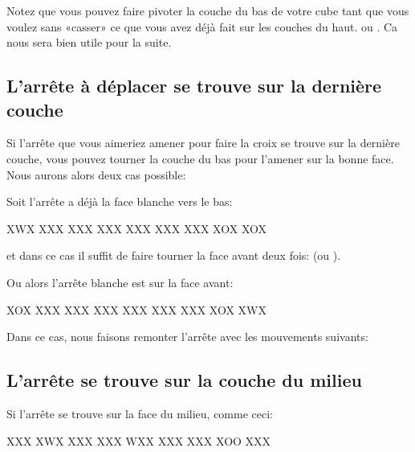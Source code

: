 \documentclass[10pt,paper=a5,pagesize]{scrbook}
\begin{document}
Notez que vous pouvez faire pivoter la couche du bas de votre cube tant que vous voulez sans «casser» ce que vous avez déjà fait sur les couches du haut.  ou . Ca nous sera bien utile pour la suite.

\subsection{L'arrête à déplacer se trouve sur la dernière couche}
\label{subsec:c1d}

Si l'arrête que vous aimeriez amener pour faire la croix se trouve sur la dernière couche, vous pouvez tourner la couche du bas pour l'amener sur la bonne face. Nous aurons alors deux cas possible:

Soit l'arrête a déjà la face blanche vers le bas:

\begin{center}
	\RubikFaceDown%
	{X}{W}{X}%
	{X}{X}{X}%
	{X}{X}{X}
	\RubikFaceRight%
	{X}{X}{X}%
	{X}{X}{X}%
	{X}{X}{X}
	\RubikFaceFront%
	{X}{X}{X}%
	{X}{O}{X}%
	{X}{O}{X}
\end{center}

et dans ce cas il suffit de faire tourner la face avant deux fois:  (ou ).

Ou alors l'arrête blanche est sur la face avant:

\begin{center}
	\RubikFaceDown%
	{X}{O}{X}%
	{X}{X}{X}%
	{X}{X}{X}
	\RubikFaceRight%
	{X}{X}{X}%
	{X}{X}{X}%
	{X}{X}{X}
	\RubikFaceFront%
	{X}{X}{X}%
	{X}{O}{X}%
	{X}{W}{X}
\end{center}

Dans ce cas, nous faisons remonter l'arrête avec les mouvements suivants: 


\subsection{L'arrête se trouve sur la couche du milieu}

Si l'arrête se trouve sur la face du milieu, comme ceci:

\begin{center}
	\RubikFaceUp%
	{X}{X}{X}%
	{X}{W}{X}%
	{X}{X}{X}
	\RubikFaceRight%
	{X}{X}{X}%
	{W}{X}{X}%
	{X}{X}{X}
	\RubikFaceFront%
	{X}{X}{X}%
	{X}{O}{O}%
	{X}{X}{X}
\end{center}
\end{document}
